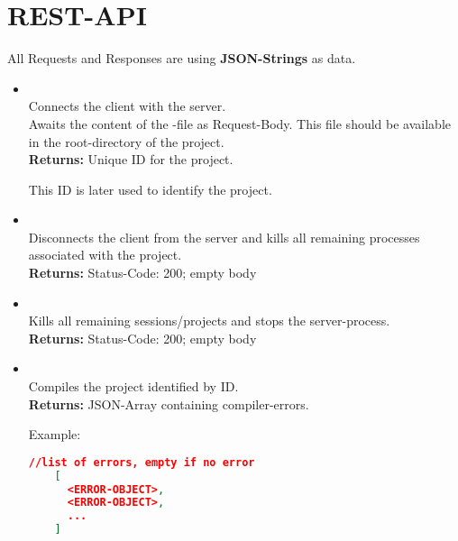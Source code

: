 \section{REST-API}

\newcommand{\returnline}[1]{\textbf{Returns:} #1}
\newcommand{\return}[2]{\textbf{Returns:} #1
  \begin{addmargin}{0.05\textwidth}
  #2
  \end{addmargin}
}
\newcommand{\param}[2]{\textbf{Request-Body:} #1
  \begin{addmargin}{0.05\textwidth}
  #2
  \end{addmargin}
}

All Requests and Responses are using \textbf{JSON-Strings} as data.

\begin{itemize}
  \item {} \\
  Connects the client with the server. \\
  Awaits the content of the  -file as Request-Body. This file should be
  available in the root-directory of the project. \\
  \return{Unique ID for the project.}{This ID is later used to identify the project.}

  \item {} \\
  Disconnects the client from the server and kills all remaining processes associated
  with the project. \\
  \returnline{Status-Code: 200; empty body}

  \item {} \\
  Kills all remaining sessions/projects and stops the server-process. \\
  \returnline{Status-Code: 200; empty body}

  \item {} \\
  Compiles the project identified by ID. \\
  \return{JSON-Array containing compiler-errors.}{Example:}
  \begin{lstlisting}[basicstyle=\small,language=json]
    //list of errors, empty if no error
    [
      <ERROR-OBJECT>,
      <ERROR-OBJECT>,
      ...
    ]
  \end{lstlisting}


\end{itemize}
